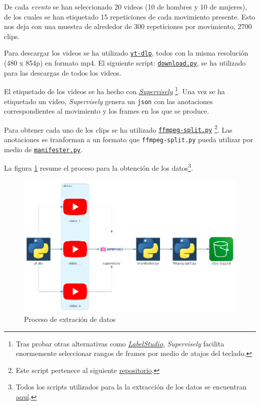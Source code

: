 De cada \textit{evento} se han seleccionado 20 videos (10 de hombres y 10 de mujeres), de los cuales se han etiquetado 15 repeticiones de cada movimiento presente. Esto nos deja con una muestra de alrededor de 300 repeticiones por movimiento, 2700 clips.

Para descargar los videos se ha utilizado \href{https://github.com/yt-dlp/yt-dlp}{\texttt{yt-dlp}}, todos con la misma resolución (480 x 854p) en formato mp4. El siguiente script: \href{https://github.com/plaguss/tfm-misc/blob/main/scripts/download.py}{\texttt{download.py}}, se ha utilizado para las descargas de todos los videos.

El etiquetado de los videos se ha hecho con \href{https://supervise.ly/}{\textit{Supervisely}} \footnote{Tras probar otras alternativas como \href{https://labelstud.io/}{\textit{LabelStudio}}, \textit{Supervisely} facilita enormemente seleccionar rangos de frames por medio de atajos del teclado.}.
Una vez se ha etiquetado un video, \textit{Supervisely} genera un \texttt{json} con las anotaciones correspondientes al movimiento y los frames en los que se produce.

Para obtener cada uno de los clips se ha utilizado \href{https://github.com/plaguss/tfm-misc/blob/main/scripts/ffmpeg-split.py}{\texttt{ffmpeg-split.py}} \footnote{Este script pertenece al siguiente \href{https://github.com/c0decracker/video-splitter}{repositorio}.}. Las anotaciones se tranforman a un formato que \texttt{ffmpeg-split.py} pueda utilizar por medio de \href{https://github.com/plaguss/tfm-misc/blob/main/scripts/manifester.py}{\texttt{manifester.py}}.

La figura \ref{data_extraction_process} resume el proceso para la obtención de los datos\footnote{Todos los scripts utilizados para la la extracción de los datos se encuentran \href{https://github.com/plaguss/tfm-misc/tree/main/scripts}{aquí}.}.


\begin{figure}[H]
    \centering
		\includegraphics[width=\textwidth]{figs/data_extraction_process_.png}
\caption{Proceso de extración de datos}\label{data_extraction_process}
\end{figure}


